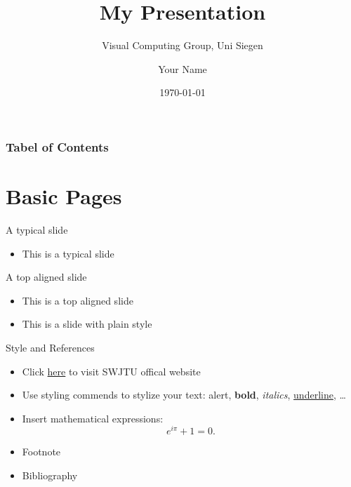\documentclass{beamer}
\title{My Presentation}
\subtitle{Visual Computing Group, Uni Siegen}
\author{Your Name}
\institute{Universität Siegen}
\date{\today}
\begin{document}
\begin{frame}[plain]
    \titlepage
\end{frame}


{
\begin{frame}
    \frametitle{Tabel of Contents}
    \tableofcontents
\end{frame}
}


\section{Basic Pages}

\begin{frame}{A typical slide}
    \begin{itemize}
        \item This is a typical slide
    \end{itemize}
\end{frame}

\begin{frame}[t]{A top aligned slide}
    \vspace{20pt}
    \begin{itemize}
        \item This is a top aligned slide
    \end{itemize}
\end{frame}

\begin{frame}[plain]
    \begin{itemize}
        \item This is a slide with plain style
    \end{itemize}
\end{frame}

\begin{frame}{Style and References}
    \begin{itemize}
        \item Click \textcolor{href}{\href{https://www.swjtu.edu.cn/}{here}} to visit SWJTU offical website
        \item Use styling commends to stylize your text: \alert{alert}, \textbf{bold}, \textit{italics}, \underline{underline}, \dots
        \item Insert mathematical expressions:
        \begin{equation*}
            e^{i\pi} + 1 = 0.
        \end{equation*}
        \item Footnote\footnotemark
        \item Bibliography \cite{knuth}
    \end{itemize}
\end{frame}
\end{document}
